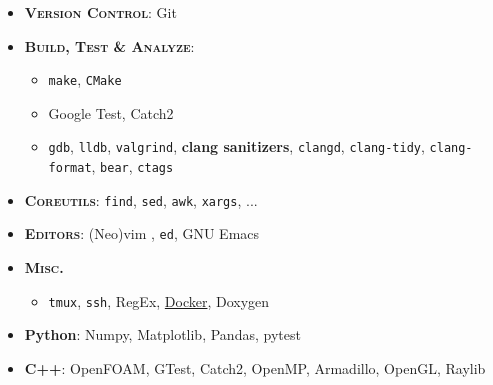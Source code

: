 %
%
%

\twocolumnsection
{
\begin{skills}
\end{skills}}
{
\vspace{1em}
\begin{itemize}
  \item \textsc{\textbf{Version Control}}: Git
  \item \textsc{\textbf{Build, Test \& Analyze}}:
    \begin{itemize}
      \item \texttt{make}, \texttt{CMake}
      \item Google Test, Catch2
      \item \texttt{gdb}, \texttt{lldb}, \texttt{valgrind}, \textbf{clang sanitizers}, \texttt{clangd}, \texttt{clang-tidy}, \texttt{clang-format}, \texttt{bear}, \texttt{ctags}
    \end{itemize}
  \item \textsc{\textbf{Coreutils}}: \texttt{find}, \texttt{sed}, \texttt{awk}, \texttt{xargs}, ...
  \item \textsc{\textbf{Editors}}: (Neo)vim , \texttt{ed}, GNU Emacs
  \item \textsc{\textbf{Misc.}}
    \begin{itemize}
      \item \texttt{tmux},
      \texttt{ssh},
      RegEx,
      \href{https://gist.github.com/reverseila/33d9173c872fb34efa055326859b0c5b}{\color{basecolor} Docker},
      Doxygen
    \end{itemize}
\end{itemize}
}

\vspace{10pt}

{
\vspace{1em}
  \begin{itemize}
    \item \textbf{Python}: Numpy, Matplotlib, Pandas, pytest
    \item \textbf{C++}: OpenFOAM, GTest, Catch2, OpenMP, Armadillo, OpenGL, Raylib
  \end{itemize}
}

